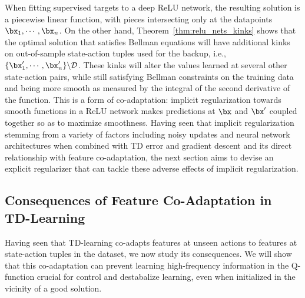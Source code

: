 When fitting supervised targets to a deep ReLU network, the resulting solution is a piecewise linear function, with pieces intersecting only at the datapoints $\bx_1, \cdots, \bx_n$. On the other hand, Theorem~\ref{thm:relu_nets_kinks} shows that the optimal solution that satisfies Bellman equations will have additional kinks on out-of-sample state-action tuples used for the backup, i.e., $\{\bx'_1, \cdots, \bx'_n\} \backslash \mathcal{D}$. These kinks will alter the values learned at several other state-action pairs, while still satisfying Bellman constraints on the training data and being more smooth as measured by the integral of the second derivative of the function. This is a form of co-adaptation: implicit regularization towards smooth functions in a ReLU network makes predictions at $\bx$ and $\bx'$ coupled together so as to maximize smoothness. Having seen that implicit regularization stemming from a variety of factors including noisy updates and neural network architectures when combined with TD error and gradient descent and its direct relationship with feature co-adaptation, the next section aims to devise an explicit regularizer that can tackle these adverse effects of implicit regularization.   
\fi


\iffalse
\subsection{Consequences of Feature Co-Adaptation in TD-Learning}
Having seen that TD-learning co-adapts features at unseen actions to features at state-action tuples in the dataset, we now study its consequences. We will show that this co-adaptation can prevent learning high-frequency information in the Q-function crucial for control and destabalize learning, even when initialized in the vicinity of a good solution.

